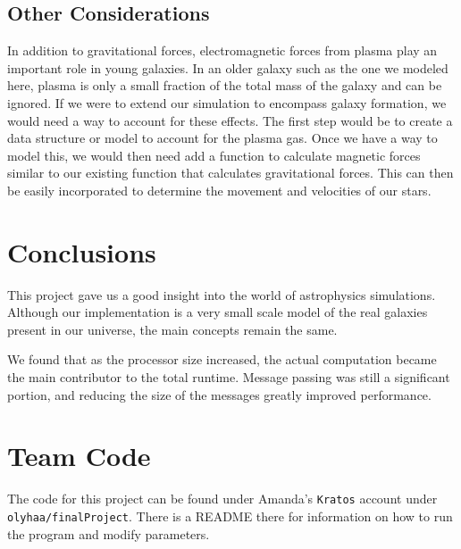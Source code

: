 \documentclass{article}
\begin{document}
\subsection{Other Considerations}

In addition to gravitational forces, electromagnetic forces from plasma play an important role in young galaxies.  In an older galaxy such as the one we modeled here, plasma is only a small fraction of the total mass of the galaxy and can be ignored.  If we were to extend our simulation to encompass galaxy formation, we would need a way to account for these effects.  The first step would be to create a data structure or model to account for the plasma gas.  Once we have a way to model this, we would then need add a function to calculate magnetic forces similar to our existing function that calculates gravitational forces.  This can then be easily incorporated to determine the movement and velocities of our stars.

\section{Conclusions}

This project gave us a good insight into the world of astrophysics simulations.  Although our implementation is a very small scale model of the real galaxies present in our universe, the main concepts remain the same. 

We found that as the processor size increased, the actual computation became the main contributor to the total runtime.  Message passing was still a significant portion, and reducing the size of the messages greatly improved performance.  

\section{Team Code}

The code for this project can be found under Amanda's \texttt{Kratos} account under \texttt{olyhaa/finalProject}.  There is a README there for information on how to run the program and modify parameters.
\end{document}
